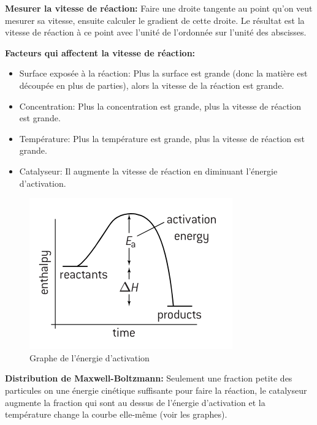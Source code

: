 \documentclass[french, a4paper, 12pt]{article}
\begin{document}
\vspace{0.5em}
\textbf{Mesurer la vitesse de réaction:}
Faire une droite tangente au point qu'on veut mesurer sa vitesse, ensuite calculer le gradient de cette droite. Le résultat est la vitesse de réaction à ce point avec l'unité de l'ordonnée sur l'unité des abscisses.

\vspace{0.5em}
\textbf{Facteurs qui affectent la vitesse de réaction:}
\begin{itemize}
\item Surface exposée à la réaction: Plus la surface est grande (donc la matière est découpée en plus de parties), alors la vitesse de la réaction est grande.
\item Concentration: Plus la concentration est grande, plus la vitesse de réaction est grande.
\item Température: Plus la température est grande, plus la vitesse de réaction est grande.
\item Catalyseur: Il augmente la vitesse de réaction en diminuant l'énergie d'activation.
\end{itemize}

\begin{figure}[H]
\centering
\includegraphics[scale=0.9]{activation_energy}
\caption{Graphe de l'énergie d'activation}
\end{figure}

\vspace{0.5em}
\textbf{Distribution de Maxwell-Boltzmann:}
Seulement une fraction petite des particules on une énergie cinétique suffisante pour faire la réaction, le catalyseur augmente la fraction qui sont au dessus de l'énergie d'activation et la température change la courbe elle-même (voir les graphes).
\end{document}
